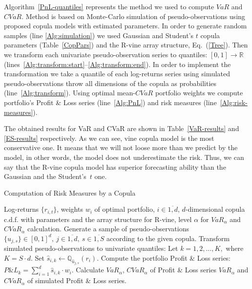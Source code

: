 \documentclass{llncs}
\begin{document}
Algorithm~\ref{PnL-quantiles} represents the method we used to compute $VaR$ and $CVaR$. Method is based on Monte-Carlo simulation of pseudo-observations using proposed copula models with estimated parameters. In order to generate random samples (line \ref{Alg:simulation}) we used Gaussian and Student's $t$ copula parameters (Table~\ref{CopPars}) and the R-vine array structure, Eq.~(\ref{Tree}).  Then we transform each univariate pseudo-observation series to quantiles: $[0,1] \to \mathbb{R}$  (lines~\ref{Alg:transform:start}--\ref{Alg:transform:end}). In order to implement the transformation we take a quantile of each log-returns series using simulated pseudo-observations throw all dimensions of the copula as probabilities (line~\ref{Alg:transform}). Using optimal mean-$CVaR$ portfolio weights we compute portfolio's Profit \& Loss series (line~\ref{Alg:PnL}) and risk measures (line~\ref{Alg:risk-measures}). 

The obtained results for VaR and CVaR are shown in Table~\ref{VaR-results} and \ref{ES-results} respectively. As we can see, 
vine copula model is the most conservative one. %
It means that we will not loose more than we predict by the model, in other words, the model does not underestimate the risk. Thus, we can say that the R-vine copula model has superior %
forecasting ability than the Gaussian and the Student's~$t$ one.

\begin{algorithm}
\caption{Computation of Risk Measures by a Copula}
\label{PnL-quantiles}
\begin{algorithmic}[1]
	\Require Log-returns $\{r_{i,t}\}$, weights $w_i$ of optimal portfolio, $i \in \overline{1,d}$, $d$-dimensional copula c.d.f. with parameters and the array structure for R-vine, level $\alpha$ for $VaR_\alpha$ and $CVaR_\alpha$ calculation.
	\State Generate a sample of pseudo-observations $\{\hat{u}_{j,s}\} \in [0, 1]^d, \ j \in \overline{1,d}, \ s \in \overline{1, S}$ according to the given copula.\label{Alg:simulation}
	\State Transform simulated pseudo-observations to univariate quantiles:
	\label{Alg:transform:start}
	\State Let $k = 1,2,\ldots,K,$ where $K = S \cdot d$.
	            \State Set $\hat{s}_{i,k} \gets \mathbb{Q}_{\hat{u}_{j,s}}  (r_i)$. \label{Alg:transform}
	        \EndFor
	    \EndFor
	\EndFor \label{Alg:transform:end}
	\State Compute the portfolio Profit \& Loss series: 
	\State $P\&L_k = \sum_{i=1}^d \hat{s}_{i,k} \cdot w_i$. \label{Alg:PnL}
	\EndFor
	\State Calculate $VaR_\alpha$, $CVaR_\alpha$ of Profit \& Loss series \label{Alg:risk-measures} %
	\Ensure $VaR_\alpha$ and $CVaR_\alpha$ of simulated Profit \& Loss series.
\end{algorithmic}
\end{algorithm}
\end{document}
